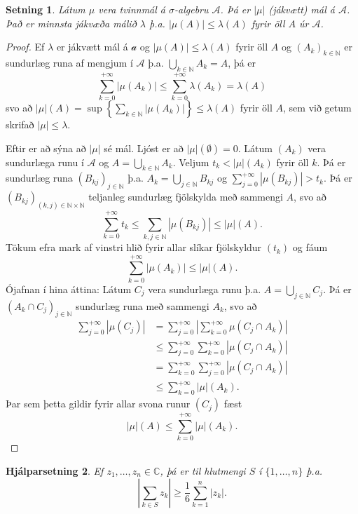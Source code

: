 \documentclass[a4paper,icelandic,11pt]{book}
\theoremstyle{plain}      \newtheorem{setn}{Setning}[chapter]
\newtheorem{lemma}[setn]{Hjálparsetning}
\theoremstyle{definition} \newtheorem{skilgr}[setn]{Skilgreining}
\theoremstyle{remark}     \newtheorem*{ath}{Athugasemd}
\newcommand{\C}{\mathbb C}
\newcommand{\N}{\mathbb N}
\begin{document}
\begin{setn}
  Látum $\mu$ vera tvinnmál á $\sigma$-algebru $\mathcal A$. Þá er
  $|\mu|$ (jákvætt) mál á $\mathcal A$. Það er minnsta jákvæða málið
  $\lambda$ þ.a. $|\mu(A)|\le\lambda(A)$ fyrir öll $A$ úr $\mathcal
  A$.
\end{setn}
\begin{proof}
  Ef $\lambda$ er jákvætt mál á $\mathcal a$ og
  $|\mu(A)|\le\lambda(A)$ fyrir öll $A$ og $(A_{k})_{k\in\N}$ er
  sundurlæg runa af mengjum í $\mathcal A$
  þ.a. $\bigcup_{k\in\N}A_{k}=A$, þá er 
  \[
  \sum_{k=0}^{+\infty}|\mu(A_{k})|
  \le \sum_{k=0}^{+\infty}\lambda(A_{k})
  = \lambda(A)
  \]
  svo að
  $|\mu|(A)=\sup\left\{\sum_{k\in\N}|\mu(A_{k})|\right\}\le\lambda(A)$
  fyrir öll $A$, sem við getum skrifað $|\mu|\le\lambda$.

  Eftir er að sýna að $|\mu|$ sé mál. Ljóst er að
  $|\mu|(\emptyset)=0$. Látum $(A_{k})$ vera sundurlæga runu í
  $\mathcal A$ og $A=\bigcup_{k\in\N}A_{k}$. Veljum
  $t_{k}<|\mu|(A_{k})$ fyrir öll $k$. Þá er sundurlæg runa
  $(B_{kj})_{j\in\N}$ þ.a. $A_{k}=\bigcup_{j\in\N}B_{kj}$ og
  $\sum_{j=0}^{+\infty}|\mu(B_{kj})|>t_{k}$. Þá er
  $(B_{kj})_{(k,j)\in\N\times\N}$ teljanleg sundurlæg fjölskylda með
  sammengi $A$, svo að 
  \[
  \sum_{k=0}^{+\infty}t_{k}
  \le \sum_{k,j\in\N} |\mu(B_{kj})|
  \le |\mu|(A).
  \]
  Tökum efra mark af vinstri hlið fyrir allar slíkar fjölskyldur
  $(t_{k})$ og fáum 
  \[
  \sum_{k=0}^{+\infty}|\mu(A_{k})|
  \le |\mu|(A).
  \]
  Ójafnan í hina áttina: Látum $C_{j}$ vera sundurlæga runu þ.a. $A =
  \bigcup_{j\in\N}C_{j}$. Þá er $(A_{k}\cap C_{j})_{j\in\N}$ sundurlæg
  runa með sammengi $A_{k}$, svo að
  \begin{align*}
    \sum_{j=0}^{+\infty}|\mu(C_{j})|
    &= \sum_{j=0}^{+\infty}\left|
      \sum_{k=0}^{+\infty}\mu(C_{j}\cap A_{k})
    \right|
    \\
    &\le \sum_{j=0}^{+\infty}\sum_{k=0}^{+\infty}|\mu(C_{j}\cap{A_{k}})|
    \\
    &= \sum_{k=0}^{+\infty}\sum_{j=0}^{+\infty}|\mu(C_{j}\cap A_{k})|
    \\
    &\le \sum_{k=0}^{+\infty}|\mu|(A_{k}).
  \end{align*}
  Þar sem þetta gildir fyrir allar svona runur $(C_{j})$ fæst 
  \[
  |\mu|(A)
  \le \sum_{k=0}^{+\infty}|\mu|(A_{k}).
  \]
\end{proof}
\begin{lemma}
  Ef $z_{1},\dots,z_{n}\in\C$, þá er til hlutmengi $S$ í
  $\{1,\dots,n\}$ þ.a. 
  \[
  \left|
    \sum_{k\in S} z_{k}
  \right|
  \ge \frac 16 \sum_{k=1}^{n}|z_{k}|.
  \]
\end{lemma}
\end{document}
